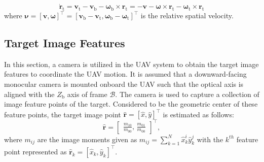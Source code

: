 \documentclass[lettersize,journal]{IEEEtran}
\begin{document}
\begin{equation} \label{Eq. (1)}
    \dot{\boldsymbol{r}}_{\text{t}} = \boldsymbol{v}_{\text{t}} - \boldsymbol{v}_{\text{b}} - \boldsymbol{\omega}_{\text{b}} \times \boldsymbol{r}_{\text{t}} = - \boldsymbol{v} - \boldsymbol{\omega} \times \boldsymbol{r}_{\text{t}} - \boldsymbol{\omega}_{\text{t}} \times \boldsymbol{r}_{\text{t}}
\end{equation}
where $\boldsymbol{\nu} = [\boldsymbol{v}, \boldsymbol{\omega}]^{\top} = [\boldsymbol{v}_{\text{b}} - \boldsymbol{v}_{\text{t}}, \boldsymbol{\omega}_{\text{b}} - \boldsymbol{\omega}_{\text{t}}]^{\top}$ is the relative spatial velocity.

\subsection{Target Image Features}
In this section, a camera is utilized in the UAV system to obtain the target image features to coordinate the UAV motion.
It is assumed that a downward-facing monocular camera is mounted onboard the UAV such that the optical axis is aligned with the $Z_{\text{b}}$ axis of frame $\mathcal{B}$.
The camera is used to capture a collection of image feature points of the target. Considered to be the geometric center of these feature points, the target image point $\boldsymbol{\hat{r}} = [\hat{x}, \hat{y}]^{\top}$ is estimated as follows:
\begin{equation}
    \boldsymbol{\hat{r}} = \begin{bmatrix} \frac{m_{10}}{m_{00}},\,\frac{m_{01}}{m_{00}} \end{bmatrix}^{\top}, 
\end{equation}
where $m_{ij}$ are the image moments given as $m_{ij} = \sum^{N}_{k=1} \hat{x}_k^i \hat{y}_k^j$ with the $k^{th}$ feature point represented as $\boldsymbol{\hat{r}}_k = [\hat{x}_k, \hat{y}_k]^{\top}$.
\end{document}
